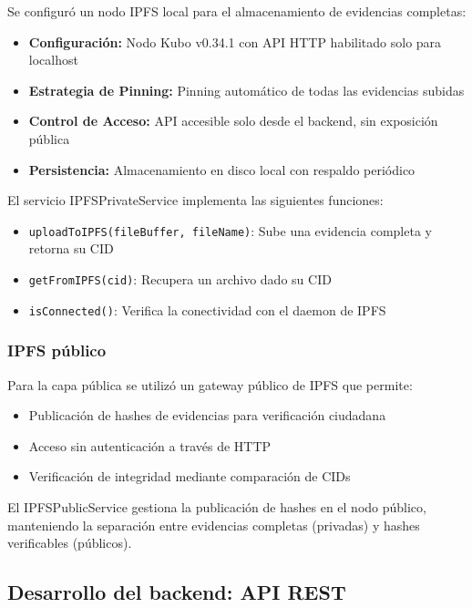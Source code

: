 Se configuró un nodo IPFS local para el almacenamiento de evidencias completas:

\begin{itemize}
    \item \textbf{Configuración:} Nodo Kubo v0.34.1 con API HTTP habilitado solo para localhost
    \item \textbf{Estrategia de Pinning:} Pinning automático de todas las evidencias subidas
    \item \textbf{Control de Acceso:} API accesible solo desde el backend, sin exposición pública
    \item \textbf{Persistencia:} Almacenamiento en disco local con respaldo periódico
\end{itemize}

El servicio IPFSPrivateService implementa las siguientes funciones:

\begin{itemize}
    \item \texttt{uploadToIPFS(fileBuffer, fileName)}: Sube una evidencia completa y retorna su CID
    \item \texttt{getFromIPFS(cid)}: Recupera un archivo dado su CID
    \item \texttt{isConnected()}: Verifica la conectividad con el daemon de IPFS
\end{itemize}

\subsubsection{IPFS público}

Para la capa pública se utilizó un gateway público de IPFS que permite:

\begin{itemize}
    \item Publicación de hashes de evidencias para verificación ciudadana
    \item Acceso sin autenticación a través de HTTP
    \item Verificación de integridad mediante comparación de CIDs
\end{itemize}

El IPFSPublicService gestiona la publicación de hashes en el nodo público, manteniendo la separación entre evidencias completas (privadas) y hashes verificables (públicos).

\subsection{Desarrollo del backend: API REST}

